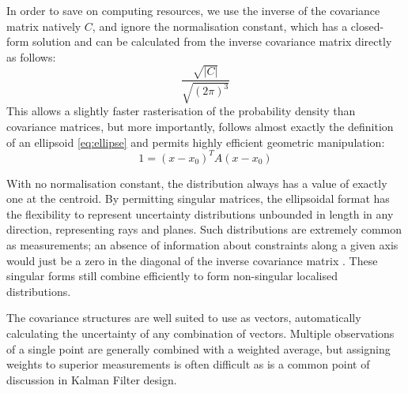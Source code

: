 \documentclass[a4paper, 11pt, titlepage]{article}
\newcounter{subsubsubsection}[subsubsection]
\begin{document}
        In order to save on computing resources, we use the inverse of the covariance matrix natively \(C\), and ignore the normalisation constant, which has a closed-form solution and can be calculated from the inverse covariance matrix directly as follows:
        \begin{equation}
        \frac{\sqrt{|C|}}{\sqrt{(2\pi)^3}}
        \end{equation}
        This allows a slightly faster rasterisation of the probability density than covariance matrices, but more importantly, follows almost exactly the definition of an ellipsoid \ref{eq:ellipse} and permits highly efficient geometric manipulation:
        \begin{equation}
        1 = \left(x-x_0\right)^T A \left(x-x_0\right)
        \label{eq:ellipse}
        \end{equation}

        With no normalisation constant, the distribution always has a value of exactly one at the centroid.
        By permitting singular matrices, the ellipsoidal format has the flexibility to represent uncertainty distributions unbounded in length in any direction, representing rays and planes.  Such distributions are extremely common as measurements; an absence of information about constraints along a given axis would just be a zero in the diagonal of the inverse covariance matrix \cite{UncertainGeo}.  These singular forms still combine efficiently to form non-singular localised distributions.
        
      \label{sec:covarInter}
        The covariance structures are well suited to use as vectors, automatically calculating the uncertainty of any combination of vectors. 
        Multiple observations of a single point are generally combined with a weighted average, but assigning weights to superior measurements is often difficult as is a common point of discussion in Kalman Filter design.
        
\end{document}
